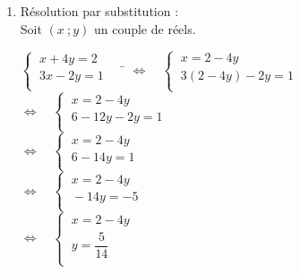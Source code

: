 \documentclass[a4paper,11pt,exos]{nsi} %
\begin{document}
\begin{enumerate}
        \item Résolution par substitution :\\
        Soit $(x\ ;y)$ un couple de réels.
            \begin{tabbing}
                $\left\{
                    \begin{array}{l}
                        \ x+4y=2 \\
				        \ 3x-2y=1 \\
                    \end{array} \right. \quad$  \= $\iff\quad 
                    \left\{
                        \begin{array}{l}
                            \ x=2-4y \\
                            \ 3(2-4y)-2y=1 \\
                    \end{array} \right.$\\[.5em]
        
                    \>  $\iff\quad \left\{
                        \begin{array}{l}
                            \ x=2-4y \\
                            \ 6-12y-2y=1 \\
                    \end{array} \right.$\\[.5em]

                    \>  $\iff\quad \left\{
                        \begin{array}{l}
                            \ x=2-4y \\
                            \ 6-14y=1 \\
                    \end{array} \right.$\\[.5em]

                    \>  $\iff\quad \left\{
                        \begin{array}{l}
                            \ x=2-4y \\
                            \ -14y=-5 \\
                    \end{array} \right.$\\[.5em]

                    \>  $\iff\quad \left\{
                        \begin{array}{l}
                            \ x=2-4y \\
                            \ y=\dfrac{5}{14} \\
                    \end{array} \right.$\\[.5em]


\end{tabbing}
\end{enumerate}
\end{document}
